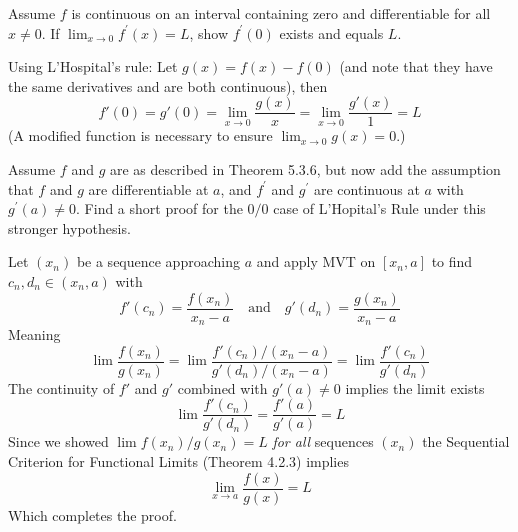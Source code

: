 \begin{exercise}
  Assume $f$ is continuous on an interval containing zero and differentiable for all $x \neq 0$. If $\lim _{x \rightarrow 0} f^{\prime}(x)=L$, show $f^{\prime}(0)$ exists and equals $L$.
\end{exercise}
\begin{solution}
  Using L'Hospital's rule: Let \(g(x) = f(x) - f(0)\) (and note that they have the same derivatives and are both continuous), then
  \[f'(0) = g'(0) = \lim_{x \to 0} \frac{g(x)}{x} = \lim_{x \to 0}\frac{g'(x)}{1} = L\]
  (A modified function is necessary to ensure \(\lim_{x \to 0} g(x) = 0\).)
\end{solution}

\begin{exercise}
  Assume $f$ and $g$ are as described in Theorem 5.3.6, but now add the assumption that $f$ and $g$ are differentiable at $a$, and $f^{\prime}$ and $g^{\prime}$ are continuous at $a$ with $g^{\prime}(a) \neq 0$. Find a short proof for the $0 / 0$ case of L'Hopital's Rule under this stronger hypothesis.
\end{exercise}
\begin{solution}
  Let $(x_n)$ be a sequence approaching $a$ and apply MVT on $[x_n,a]$ to find $c_n,d_n \in (x_n,a)$ with
  $$
  f'(c_n) = \frac{f(x_n)}{x_n - a} \quad\text{and}\quad g'(d_n) = \frac{g(x_n)}{x_n - a}
  $$
  Meaning
  $$
  \lim \frac{f(x_n)}{g(x_n)} = \lim \frac{f'(c_n)/(x_n-a)}{g'(d_n)/(x_n-a)} = \lim \frac{f'(c_n)}{g'(d_n)}
  $$
  The continuity of $f'$ and $g'$ combined with $g'(a) \ne 0$ implies the limit exists
  $$
  \lim \frac{f'(c_n)}{g'(d_n)} = \frac{f'(a)}{g'(a)} = L
  $$
  Since we showed $\lim f(x_n)/g(x_n) = L$ \emph{for all} sequences $(x_n)$ the Sequential Criterion for Functional Limits (Theorem 4.2.3) implies
  $$
  \lim_{x \to a} \frac{f(x)}{g(x)} = L
  $$
  Which completes the proof.
\end{solution}

